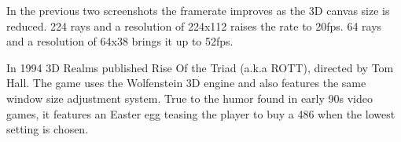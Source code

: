    \begin{figure}[H]
\centering
 \end{figure}
 \par
 In the previous two screenshots the framerate improves as the 3D canvas size is reduced. 224 rays and a resolution of 224x112 raises the rate to 20fps. 64 rays and a resolution of 64x38 brings it up to 52fps.\\
 \par
{} In 1994 3D Realms published Rise Of the Triad (a.k.a ROTT), directed by Tom Hall. The game uses the Wolfenstein 3D engine and also features the same window size adjustment system. True to the humor found in early 90s video games, it features an Easter egg teasing the player to buy a 486 when the lowest setting is chosen.
    \begin{figure}[H]
\centering
 \end{figure}
 \par
